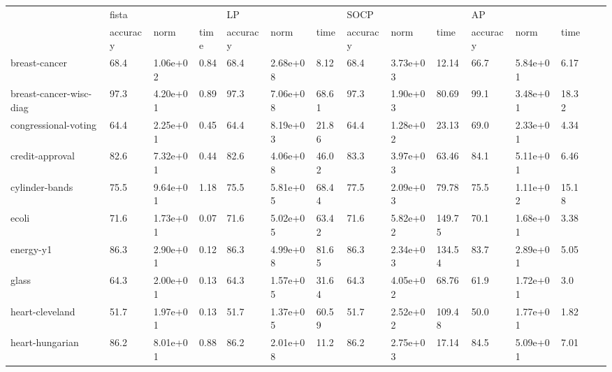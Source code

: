 
\iffalse
	\begin{table}
		\begin{tabular}{lllllllllllllll}
			                                  & fista    &          &      & LP       &          &        & SOCP     &          &        & AP       &          &       &   & \\
			                                  & accuracy & norm     & time & accuracy & norm     & time   & accuracy & norm     & time   & accuracy & norm     & time  &     \\
			breast-cancer                     & 68.4     & 1.06e+02 & 0.84 & 68.4     & 2.68e+08 & 8.12   & 68.4     & 3.73e+03 & 12.14  & 66.7     & 5.84e+01 & 6.17  &   & \\
			breast-cancer-wisc-diag           & 97.3     & 4.20e+01 & 0.89 & 97.3     & 7.06e+08 & 68.61  & 97.3     & 1.90e+03 & 80.69  & 99.1     & 3.48e+01 & 18.32 &   & \\
			congressional-voting              & 64.4     & 2.25e+01 & 0.45 & 64.4     & 8.19e+03 & 21.86  & 64.4     & 1.28e+02 & 23.13  & 69.0     & 2.33e+01 & 4.34  &   & \\
			credit-approval                   & 82.6     & 7.32e+01 & 0.44 & 82.6     & 4.06e+08 & 46.02  & 83.3     & 3.97e+03 & 63.46  & 84.1     & 5.11e+01 & 6.46  &   & \\
			cylinder-bands                    & 75.5     & 9.64e+01 & 1.18 & 75.5     & 5.81e+05 & 68.44  & 77.5     & 2.09e+03 & 79.78  & 75.5     & 1.11e+02 & 15.18 &   & \\
			ecoli                             & 71.6     & 1.73e+01 & 0.07 & 71.6     & 5.02e+05 & 63.42  & 71.6     & 5.82e+02 & 149.75 & 70.1     & 1.68e+01 & 3.38  &   & \\
			energy-y1                         & 86.3     & 2.90e+01 & 0.12 & 86.3     & 4.99e+08 & 81.65  & 86.3     & 2.34e+03 & 134.54 & 83.7     & 2.89e+01 & 5.05  &   & \\
			glass                             & 64.3     & 2.00e+01 & 0.13 & 64.3     & 1.57e+05 & 31.64  & 64.3     & 4.05e+02 & 68.76  & 61.9     & 1.72e+01 & 3.0   &   & \\
			heart-cleveland                   & 51.7     & 1.97e+01 & 0.13 & 51.7     & 1.37e+05 & 60.59  & 51.7     & 2.52e+02 & 109.48 & 50.0     & 1.77e+01 & 1.82  &   & \\
			heart-hungarian                   & 86.2     & 8.01e+01 & 0.88 & 86.2     & 2.01e+08 & 11.2   & 86.2     & 2.75e+03 & 17.14  & 84.5     & 5.09e+01 & 7.01  &   & \\

\end{tabular}
\end{table}
